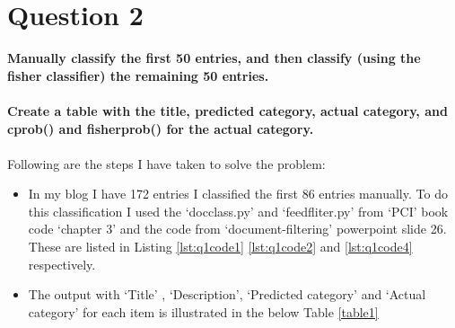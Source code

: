 \chapter{Question 2}
\label{avoiding-uri-aliases} 

\textbf {Manually classify the first 50 entries, and then classify (using the fisher classifier) the remaining 50 entries. \\\\
Create a table with the title, predicted category, actual category, and cprob() and fisherprob() for the actual category.}\\\\

Following are the steps I have taken to solve the problem:
\begin{itemize}
\item In my blog I have 172 entries I classified the first 86 entries manually. To do this classification I used the `docclass.py' and `feedfliter.py' from `PCI' book code `chapter 3' and the code from `document-filtering' powerpoint slide 26. These are listed in Listing \ref{lst:q1code1} \ref{lst:q1code2} and \ref{lst:q1code4} respectively.
\item The output with `Title' , `Description', `Predicted category' and `Actual category' for each item is illustrated in the below Table \ref{table1}


\end{itemize}
